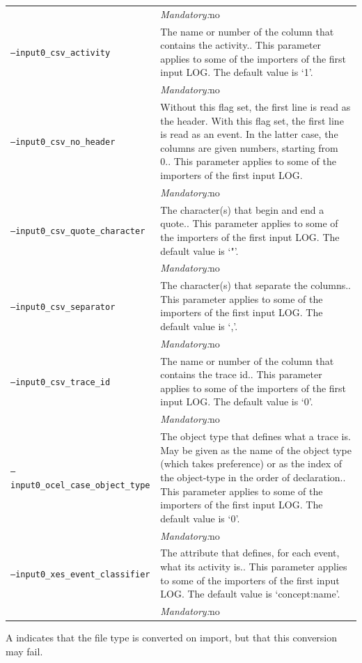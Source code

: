 {\begin{tabularx}{\linewidth}{lX}
&\textit{Mandatory:}\quad no\\
\texttt{--input0\_csv\_activity} & The name or number of the column that contains the activity.. This parameter applies to some of the importers of the first input LOG. The default value is `1'.\\
&\textit{Mandatory:}\quad no\\
\texttt{--input0\_csv\_no\_header} & Without this flag set, the first line is read as the header. 
    With this flag set, the first line is read as an event. In the latter case, the columns are given numbers, starting from 0.. This parameter applies to some of the importers of the first input LOG. \\
&\textit{Mandatory:}\quad no\\
\texttt{--input0\_csv\_quote\_character} & The character(s) that begin and end a quote.. This parameter applies to some of the importers of the first input LOG. The default value is `"'.\\
&\textit{Mandatory:}\quad no\\
\texttt{--input0\_csv\_separator} & The character(s) that separate the columns.. This parameter applies to some of the importers of the first input LOG. The default value is `,'.\\
&\textit{Mandatory:}\quad no\\
\texttt{--input0\_csv\_trace\_id} & The name or number of the column that contains the trace id.. This parameter applies to some of the importers of the first input LOG. The default value is `0'.\\
&\textit{Mandatory:}\quad no\\
\texttt{--input0\_ocel\_case\_object\_type} & The object type that defines what a trace is. May be given as the name of the object type (which takes preference) or as the index of the object-type in the order of declaration.. This parameter applies to some of the importers of the first input LOG. The default value is `0'.\\
&\textit{Mandatory:}\quad no\\
\texttt{--input0\_xes\_event\_classifier} & The attribute that defines, for each event, what its activity is.. This parameter applies to some of the importers of the first input LOG. The default value is `concept:name'.\\
&\textit{Mandatory:}\quad no\\
\bottomrule
\end{tabularx}
A \textdagger{} indicates that the file type is converted on import, but that this conversion may fail.
}
